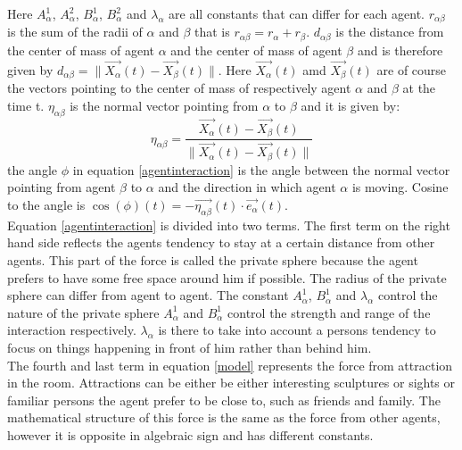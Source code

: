 \documentclass[12pt,a4paper]{report} %
\begin{document}
Here $A_{\alpha}^{1}$, $A_{\alpha}^{2}$, $B_{\alpha}^{1}$, $B_{\alpha}^{2}$ and $\lambda_{\alpha}$ are all constants that can differ for each agent. $r_{\alpha \beta}$ is the sum of the radii of $\alpha$ and $\beta$ that is 
$r_{\alpha \beta} = r_{\alpha} + r_{\beta}$. $d_{\alpha \beta}$ is the distance from the center of mass of agent $\alpha$ and the center of mass of agent $\beta$ and is therefore given by $d_{\alpha \beta} = \|\vec{X_{\alpha}}\left( t \right) - \vec{X_{\beta}}\left( t \right) \|$. Here $\vec{X_{\alpha}}\left( t \right)$ amd $\vec{X_{\beta}}\left( t \right)$ are of course the vectors pointing to the center of mass of respectively agent $\alpha$ and $\beta$ at the time t. $\eta_{\alpha \beta}$ is the normal vector pointing from $\alpha$ to $\beta$ and it is given by:
\begin{equation}
\eta_{\alpha \beta} = \frac{\vec{X_{\alpha}}\left( t \right) - \vec{X_{\beta}}\left( t \right)}{\|\vec{X_{\alpha}}\left( t \right) - \vec{X_{\beta}}\left( t \right) \|}
\end{equation}
the angle $\phi$ in equation \ref{agentinteraction} is the angle between the normal vector pointing from agent $\beta$ to $\alpha$ and the direction in which agent $\alpha$ is moving. Cosine to the angle is $\cos \left( \phi \right)\left( t \right) = - \vec{\eta_{\alpha \beta}}\left( t \right) \cdot \vec{e_{\alpha}}\left( t \right)$.\\
Equation \ref{agentinteraction} is divided into two terms. The first term on the right hand side reflects the agents tendency to stay at a certain distance from other agents. This part of the force is called the private sphere because the agent prefers to have some free space around him if possible. The radius of the private sphere can differ from agent to agent. The constant $A_{\alpha}^{1}$, $B_{\alpha}^{1}$ and $\lambda_{\alpha}$ control the nature of the private sphere $A_{\alpha}^1$ and $B_{\alpha}^1$ control the strength and range of the interaction respectively. $\lambda_{\alpha}$ is there to take into account a persons tendency to focus on things happening in front of him rather than behind him.\\
The fourth and last term in equation \ref{model} represents the force from attraction in the room. Attractions can be either be either interesting sculptures or sights or familiar persons the agent prefer to be close to, such as friends and family. The mathematical structure of this force is the same as the force from other agents, however it is opposite in algebraic sign and has different constants. 
\end{document}
